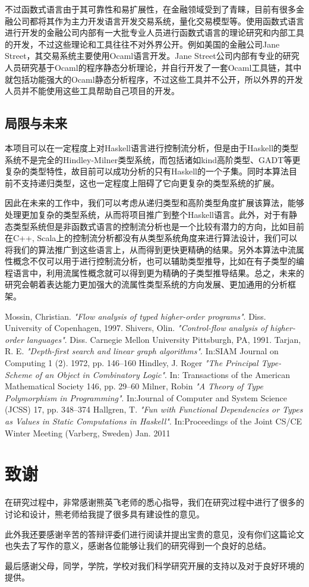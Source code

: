 \documentclass[UTF8, colorlinks]{pkuthss}
\begin{document}
	不过函数式语言由于其可靠性和易扩展性，在金融领域受到了青睐，目前有很多金融公司都将其作为主力开发语言开发交易系统，量化交易模型等。使用函数式语言进行开发的金融公司内部有一大批专业人员进行函数式语言的理论研究和内部工具的开发，不过这些理论和工具往往不对外界公开。例如美国的金融公司Jane Street，其交易系统主要使用Ocaml语言开发。Jane Street公司内部有专业的研究人员研究基于Ocaml的程序静态分析理论，并自行开发了一套Ocaml工具链，其中就包括功能强大的Ocaml静态分析程序，不过这些工具并不公开，所以外界的开发人员并不能使用这些工具帮助自己项目的开发。
	\section{局限与未来}
	本项目可以在一定程度上对Haskell语言进行控制流分析，但是由于Haskell的类型系统不是完全的Hindley-Milner类型系统，而包括诸如kind高阶类型、GADT等更复杂的类型特性，故目前可以成功分析的只有Haskell的一个子集。同时本算法目前不支持递归类型，这也一定程度上阻碍了它向更复杂的类型系统的扩展。
	
	因此在未来的工作中，我们可以考虑从递归类型和高阶类型角度扩展该算法，能够处理更加复杂的类型系统，从而将项目推广到整个Haskell语言。此外，对于有静态类型系统但是非函数式语言的控制流分析也是一个比较有潜力的方向，比如目前在C++, Scala上的控制流分析都没有从类型系统角度来进行算法设计，我们可以将我们的算法推广到这些语言上，从而得到更快更精确的结果。另外本算法中流属性概念不仅可以用于进行控制流分析，也可以辅助类型推导，比如在有子类型的编程语言中，利用流属性概念就可以得到更为精确的子类型推导结果。总之，未来的研究会朝着表达能力更加强大的流属性类型系统的方向发展、更加通用的分析框架。
	
	\begin{thebibliography}{1}
		 Mossin, Christian. {\em "Flow analysis of typed higher-order programs"}. Diss. University of Copenhagen, 1997.		
		 Shivers, Olin. {\em "Control-flow analysis of higher-order languages"}. Diss. Carnegie Mellon University Pittsburgh, PA, 1991.
		 Tarjan, R. E. {\em  "Depth-first search and linear graph algorithms"}. In:SIAM Journal on Computing 1 (2). 1972, pp. 146–160
		 Hindley, J. Roger {\em "The Principal Type-Scheme of an Object in Combinatory Logic"}. In: Transactions of the American Mathematical Society 146, pp. 29–60
		 Milner, Robin {\em "A Theory of Type Polymorphism in Programming"}. In:Journal of Computer and System Science (JCSS) 17, pp. 348–374
		 Hallgren, T.  {\em "Fun with Functional Dependencies or Types as Values in Static Computations in Haskell"}. In:Proceedings of the Joint CS/CE Winter Meeting (Varberg, Sweden) Jan. 2011
	\end{thebibliography}
	
	\backmatter
	\chapter{致谢}
	在研究过程中，非常感谢熊英飞老师的悉心指导，我们在研究过程中进行了很多的讨论和设计，熊老师给我提了很多具有建设性的意见。
	
	此外我还要感谢辛苦的答辩评委们进行阅读并提出宝贵的意见，没有你们这篇论文也失去了写作的意义，感谢各位能够让我们的研究得到一个良好的总结。
	
	最后感谢父母，同学，学院，学校对我们科学研究开展的支持以及对于良好环境的提供。
	
\end{document}
